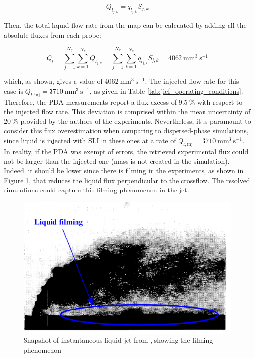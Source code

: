\begin{equation}
Q_{l_{j,k}} = q_{l_{j,k}} S_{j,k}
\end{equation}

Then, the total liquid flow rate from the map can be calcuated by adding all the absolute fluxes from each probe:

\begin{equation}
\label{eq:ch6_Ql_total_estimation_from_flux_profiles}
Q_{l} = \sum_{j=1}^{N_y} \sum_{k=1}^{N_z} Q_{l_{j,k}} = \sum_{j=1}^{N_y} \sum_{k=1}^{N_z} q_{l_{j,k}} S_{j,k} = 4062 ~ \mathrm{mm}^3~\mathrm{s}^{-1}
\end{equation}

which, as shown, gives a value of $4062 ~ \mathrm{mm}^3~\mathrm{s}^{-1}$. The injected flow rate for this case is $Q_{l,\mathrm{inj}} = 3710~ \mathrm{mm}^3~\mathrm{s}^{-1}$, as given in Table \ref{tab:jicf_operating_conditions}. Therefore, the PDA measurements report a flux excess of $9.5~\%$ with respect to the injected flow rate. This deviation is comprised within the mean uncertainty of $20~\%$ provided by the authors of the experiments. Nevertheless, it is paramount to consider this flux overestimation when comparing to dispersed-phase simulations, since liquid is injected with SLI in these ones at a rate of  $Q_{l,\mathrm{inj}} = 3710~ \mathrm{mm}^3~\mathrm{s}^{-1}$. In reality, if the PDA was exempt of errors, the retrieved experimental flux could not be larger than the injected one (mass is not created in the simulation). Indeed, it should be lower since there is filming in the experiments, as shown in Figure \ref{fig:jicf_snapshot_expe_filming}, that reduces the liquid flux perpendicular to the crossflow. The resolved simulations could capture this filming phenomenon in the jet.

\begin{figure}[h!]	
	\centering	
	\includegraphics[scale=0.4]{./part2_developments/figures_ch6_lagrangian_JICF/expe_results/snapshot_expe_filming}
	\caption{Snapshot of instantaneous liquid jet from , showing the filming phenomenon}
	\label{fig:jicf_snapshot_expe_filming}
\end{figure}




